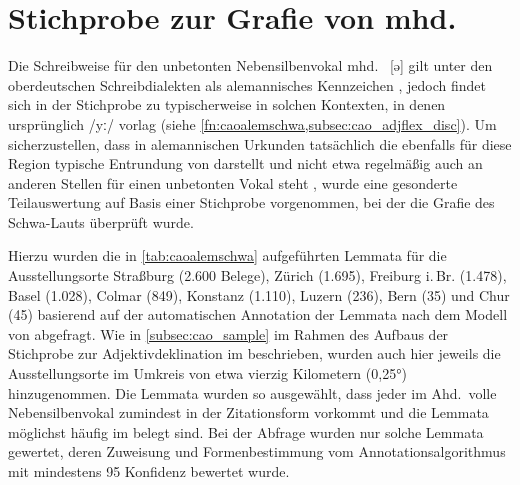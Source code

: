 \section{Stichprobe zur Grafie von mhd.\ }
\label{sec:caoalemschwa}

Die Schreibweise  für den unbetonten Nebensilbenvokal mhd.~ [ə]
gilt unter den ober\-deutschen Schreibdialekten als alemannisches Kennzeichen
\autocites[vgl.][25]{weinhold1863}[75]{weinhold1883}[41, 113]{paul2007}, jedoch
findet sich  in der Stichprobe zu  
typischerweise in solchen Kontexten, in denen ursprünglich  /yː/
vorlag (siehe \cref{fn:caoalemschwa,subsec:cao_adjflex_disc}). Um
sicherzustellen, dass  in alemannischen Urkunden tatsächlich die
ebenfalls für diese Region typische Entrundung von  darstellt und
nicht etwa regelmäßig auch an anderen Stellen für einen unbetonten Vokal steht
\autocites%
	[466--467]{schirmunski1962}%
	[41]{paul2007}%
	[305]{ksw2}%
	[vgl.~auch][131--132]{boesch1946}%
, wurde eine gesonderte Teilauswertung auf Basis einer Stichprobe vorgenommen,
bei der die Grafie des Schwa-Lauts überprüft wurde.

Hierzu wurden die in \cref{tab:caoalemschwa} aufgeführten Lemmata für die
Ausstellungsorte
Straßburg (2.600 Belege),
% 
Zürich (1.695),
% 
Freiburg i.\,Br. (1.478),
% 
Basel (1.028),
% 
Colmar (849),
% 
Konstanz (1.110),
% 
Luzern (236),
% 
Bern (35)
% 
und Chur (45)
% 
basierend auf der automatischen Annotation der Lemmata nach dem Modell von
\citet{schmid2019} abgefragt. Wie in \cref{subsec:cao_sample} im Rahmen des
Aufbaus der Stichprobe zur Adjektivdeklination im \CAO{} beschrieben,
wurden auch hier jeweils die Ausstellungsorte im Umkreis von etwa vierzig
Kilometern (0,25°) hinzugenommen. Die Lemmata wurden so ausgewählt, dass jeder
im Ahd.\ volle Nebensilbenvokal zumindest in der Zitationsform vorkommt und die
Lemmata möglichst häufig im \CAO{} belegt sind. Bei der Abfrage wurden
nur solche Lemmata gewertet, deren Zuweisung und Formenbestimmung vom
Annotations\-algorithmus mit mindestens 95\pct{} Konfidenz bewertet wurde.


